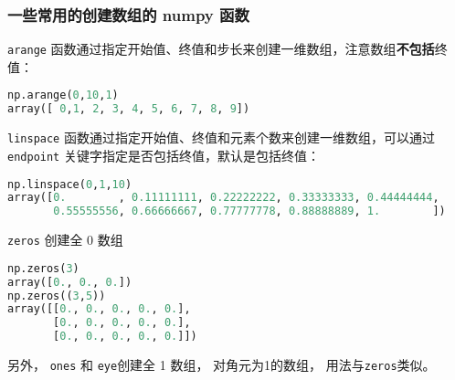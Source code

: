 \subsubsection{一些常用的创建数组的 numpy 函数}
\verb|arange| 函数通过指定开始值、终值和步长来创建一维数组，注意数组\textbf{不包括}终值：
\begin{lstlisting}[language=python]
np.arange(0,10,1)
array([ 0,1, 2, 3, 4, 5, 6, 7, 8, 9])
\end{lstlisting}

\verb|linspace| 函数通过指定开始值、终值和元素个数来创建一维数组，可以通过 \verb|endpoint| 关键字指定是否包括终值，默认是包括终值：
 \begin{lstlisting}[language=python]
np.linspace(0,1,10)
array([0.        , 0.11111111, 0.22222222, 0.33333333, 0.44444444,
       0.55555556, 0.66666667, 0.77777778, 0.88888889, 1.        ])
 \end{lstlisting}

\verb|zeros| 创建全 0 数组
\begin{lstlisting}[language=python]
np.zeros(3)
array([0., 0., 0.])
np.zeros((3,5))
array([[0., 0., 0., 0., 0.],
       [0., 0., 0., 0., 0.],
       [0., 0., 0., 0., 0.]])
\end{lstlisting} 
另外， \verb|ones| 和 \verb|eye|创建全 1 数组， 对角元为1的数组， 用法与\verb|zeros|类似。

